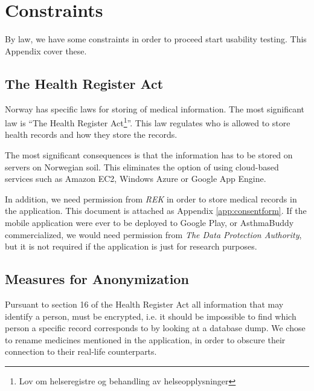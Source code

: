 
\chapter{Constraints}
\label{chp:securityrequirements}

By law, we have some constraints in order to proceed start usability testing. This Appendix cover these. 

\section{The Health Register Act}
\label{sec:helseregisterloven}

Norway has specific laws for storing of medical information. The most significant law is ``The Health Register Act\footnote{Lov om helseregistre og behandling av helseopplysninger}''\cite{helseregisterloven}. This law regulates who is allowed to store health records and how they store the records. 

The most significant consequences is that the information has to be stored on servers on Norwegian soil. This eliminates the option of using cloud-based services such as Amazon EC2, Windows Azure or Google App Engine. 

In addition, we need permission from \emph{REK} in order to store medical records in the application. This document is attached as Appendix \ref{app:consentform}. If the mobile application were ever to be deployed to Google Play, or AsthmaBuddy commercialized, we would need permission from \emph{The Data Protection Authority}, but it is not required if the application is just for research purposes. 

\section{Measures for Anonymization}
Pursuant to section 16 of the Health Register Act\cite{helseregisterloven} all information that may identify a person, must be encrypted, i.e. it should be impossible to find which person a specific record corresponds to by looking at a database dump. We chose to rename medicines mentioned in the application, in order to obscure their connection to their real-life counterparts. 